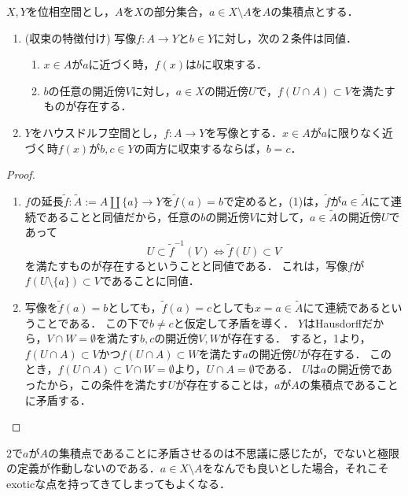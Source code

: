 \documentclass[uplatex,dvipdfmx]{jsreport}
\begin{document}
\begin{proposition}[Hausdorff空間では極限は一意的]\label{prop-uniqueness-of-limit-in-Hausdorff-space}
    $X,Y$を位相空間とし，$A$を$X$の部分集合，$a\in X\setminus A$を$A$の集積点とする．
    \begin{enumerate}
        \item (収束の特徴付け) 写像$f:A\to Y$と$b\in Y$に対し，次の２条件は同値．
        \begin{enumerate}[(1)]
            \item $x\in A$が$a$に近づく時，$f(x)$は$b$に収束する．
            \item $b$の任意の開近傍$V$に対し，$a\in X$の開近傍$U$で，$f(U\cap A)\subset V$を満たすものが存在する．
        \end{enumerate}
        \item $Y$をハウスドルフ空間とし，$f:A\to Y$を写像とする．$x\in A$が$a$に限りなく近づく時$f(x)$が$b,c\in Y$の両方に収束するならば，$b=c$．
    \end{enumerate}
\end{proposition}
\begin{proof}\mbox{}
    \begin{enumerate}
        \item $f$の延長$\widetilde{f}:\widetilde{A}:=A\coprod\{a\}\to Y$を$\widetilde{f}(a)=b$で定めると，(1)は，$\widetilde{f}$が$a\in\widetilde{A}$にて連続であることと同値だから，任意の$b$の開近傍$V$に対して，$a\in\widetilde{A}$の開近傍$U$であって
        \[U\subset\widetilde{f}^{-1}(V)\Leftrightarrow \widetilde{f}(U)\subset V\]
        を満たすものが存在するということと同値である．
        これは，写像$f$が$f(U\setminus\{a\})\subset V$であることに同値．
        \item 
        写像を$\widetilde{f}(a)=b$としても，$\widetilde{f}(a)=c$としても$x=a\in\widetilde{A}$にて連続であるということである．
        この下で$b\ne c$と仮定して矛盾を導く．
        $Y$はHausdorffだから，$V\cap W=\emptyset$を満たす$b,c$の開近傍$V,W$が存在する．
        すると，1より，$f(U\cap A)\subset V$かつ$f(U\cap A)\subset W$を満たす$a$の開近傍$U$が存在する．
        このとき，$f(U\cap A)\subset V\cap W=\emptyset$より，$U\cap A=\emptyset$である．
        $U$は$a$の開近傍であったから，この条件を満たす$U$が存在することは，$a$が$A$の集積点であることに矛盾する．
    \end{enumerate}
\end{proof}
\begin{remarks}
    2で$a$が$A$の集積点であることに矛盾させるのは不思議に感じたが，でないと極限の定義が作動しないのである．$a\in X\setminus A$をなんでも良いとした場合，それこそexoticな点を持ってきてしまってもよくなる．
\end{remarks}
\end{document}
